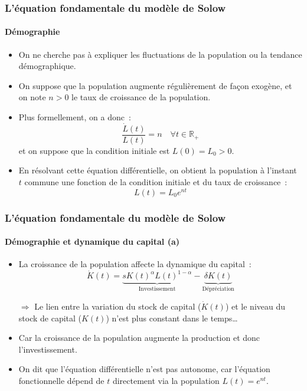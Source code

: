\documentclass[10pt,notheorems]{beamer}
\theoremstyle{plain}
\theoremstyle{definition} %
\begin{document}
\begin{frame}
  \frametitle{L'équation fondamentale du modèle de Solow}
  \framesubtitle{Démographie}

  \begin{itemize}

  \item On ne cherche pas à expliquer les fluctuations de la population ou la tendance démographique.\newline

  \item On suppose que la population augmente régulièrement de façon exogène, et on note $n>0$ le taux de croissance de la population.\newline

  \item Plus formellement, on a donc~:
    \[
      \frac{\dot L(t)}{L(t)} = n \quad \forall t\in\mathbb R_+
    \]
    et on suppose que la condition initiale est $L(0) = L_0>0$.\newline

  \item En résolvant cette équation différentielle, on obtient la population à l'instant $t$ commune une fonction de la condition initiale et du taux de croissance~:
    \[
      L(t) = L_0e^{nt}
    \]

  \end{itemize}

\end{frame}


\begin{frame}
  \frametitle{L'équation fondamentale du modèle de Solow}
  \framesubtitle{Démographie et dynamique du capital (a)}

  \begin{itemize}

  \item La croissance de la population affecte la dynamique du capital~:
    \[
      \dot K(t) =  \underbrace{s K(t)^{\alpha}L(t)^{1-\alpha}}_{\text{Investissement}} -  \underbrace{\delta K(t)}_{\text{Dépréciation}}
    \]

  \item[$\Rightarrow$] Le lien entre la variation du stock de capital
    ($\dot K(t)$) et le niveau du stock de capital ($K(t)$) n'est plus
    constant dans le temps\ldots\newline

  \item Car la croissance de la population augmente la production et donc l'investissement.\newline

  \item On dit que l'équation différentielle n'est pas autonome, car l'équation fonctionnelle dépend de $t$ directement via la population $L(t)=e^{nt}$.\newline

  \end{itemize}

\end{frame}
\end{document}
